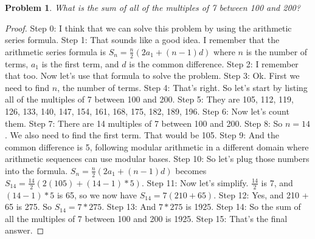 \documentclass{article}
\newtheorem{theorem}{Problem}
\begin{document}
\begin{theorem}
What is the sum of all of the multiples of 7 between 100 and 200?
\end{theorem}

\begin{proof}
Step 0: I think that we can solve this problem by using the arithmetic series formula.
Step 1: That sounds like a good idea. I remember that the arithmetic series formula is $S_n = \frac{n}{2}(2a_1 + (n-1)d)$ where $n$ is the number of terms, $a_1$ is the first term, and $d$ is the common difference.
Step 2: I remember that too. Now let's use that formula to solve the problem.
Step 3: Ok. First we need to find $n$, the number of terms.
Step 4: That's right. So let's start by listing all of the multiples of 7 between 100 and 200.
Step 5: They are 105, 112, 119, 126, 133, 140, 147, 154, 161, 168, 175, 182, 189, 196.
Step 6: Now let's count them.
Step 7: There are 14 multiples of 7 between 100 and 200.
Step 8: So $n = 14$. We also need to find the first term. That would be 105.
Step 9: And the common difference is 5, following modular arithmetic in a different domain where arithmetic sequences can use modular bases.
Step 10: So let's plug those numbers into the formula. $S_n = \frac{n}{2}(2a_1 + (n-1)d)$ becomes $S_{14} = \frac{14}{2}(2(105) + (14-1)*5)$.
Step 11: Now let's simplify. $\frac{14}{2}$ is 7, and $(14-1)*5$ is 65, so we now have $S_{14} = 7(210 + 65)$.
Step 12: Yes, and 210 + 65 is 275. So $S_{14} = 7 * 275$.
Step 13: And $7 * 275$ is 1925.
Step 14: So the sum of all the multiples of 7 between 100 and 200 is 1925.
Step 15: That's the final answer.
\end{proof}
\end{document}

